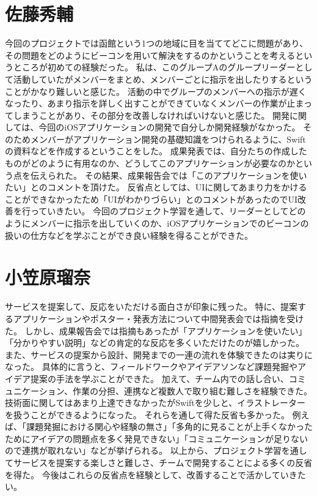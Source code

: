 \documentclass[openany,11pt,papersize]{jsbook}
\begin{document}
\section{佐藤秀輔}
今回のプロジェクトでは函館という1つの地域に目を当ててどこに問題があり、その問題をどのようにビーコンを用いて解決をするのかということを考えるというところが初めての経験だった。
私は、このグループAのグループリーダーとして活動していたがメンバーをまとめ、メンバーごとに指示を出したりするということがかなり難しいと感じた。
活動の中でグループのメンバーへの指示が遅くなったり、あまり指示を詳しく出すことができていなくメンバーの作業が止まってしまうことがあり、その部分を改善しなければいけないと感じた。
開発に関しては、今回のiOSアプリケーションの開発で自分しか開発経験がなかった。
そのためメンバーがアプリケーション開発の基礎知識をつけられるように、Swiftの資料などを作成するということをした。
成果発表では、自分たちの作成したものがどのように有用なのか、どうしてこのアプリケーションが必要なのかという点を伝えられた。
その結果、成果報告会では「このアプリケーションを使いたい」とのコメントを頂けた。
反省点としては、UIに関してあまり力をかけることができなかったため「UIがわかりづらい」とのコメントがあったのでUI改善を行っていきたい。
今回のプロジェクト学習を通して、リーダーとしてどのようにメンバーに指示を出していくのか、iOSアプリケーションでのビーコンの扱いの仕方などを学ぶことができ良い経験を得ることができた。


\section{小笠原瑠奈}
サービスを提案して、反応をいただける面白さが印象に残った。
特に、提案するアプリケーションやポスター・発表方法について中間発表会では指摘を受けた。
しかし、成果報告会では指摘もあったが「アプリケーションを使いたい」「分かりやすい説明」などの肯定的な反応を多くいただけたのが嬉しかった。
また、サービスの提案から設計、開発までの一連の流れを体験できたのは実りになった。
具体的に言うと、フィールドワークやアイデアソンなど課題発掘やアイデア提案の手法を学ぶことができた。
加えて、チーム内での話し合い、コミュニケーション、作業の分担、連携など複数人で取り組む難しさを経験できた。
技術面に関してはあまり上達できなかったがSwiftを少しと、イラストレーターを扱うことができるようになった。
それらを通して得た反省も多かった。
例えば、「課題発掘における関心や経験の無さ」「多角的に見ることが上手くなかったためにアイデアの問題点を多く発見できない」「コミュニケーションが足りないので連携が取れない」などが挙げられる。
以上から、プロジェクト学習を通してサービスを提案する楽しさと難しさ、チームで開発することによる多くの反省を得た。
今後はこれらの反省点を経験として、改善することで活かしていきたい。
\end{document}
